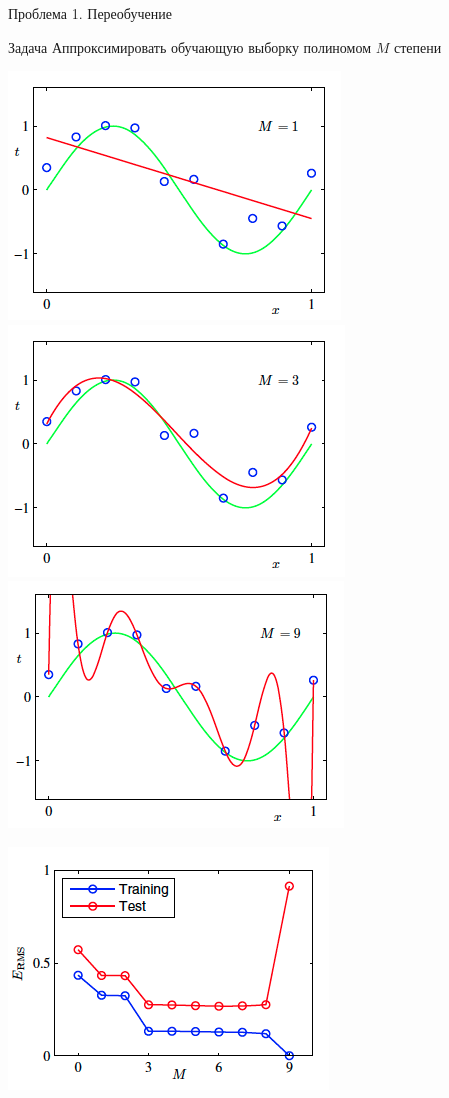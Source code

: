 \documentclass[10pt]{beamer}
\begin{document}
\begin{frame}{Проблема 1. Переобучение}

\begin{block}{Задача}
Аппроксимировать обучающую выборку полиномом $M$ степени
\end{block}

\begin{center}
\includegraphics[scale=0.3]{images/m1.png}
\includegraphics[scale=0.3]{images/m2.png}
\includegraphics[scale=0.3]{images/m3.png}

\includegraphics[scale=0.3]{images/of.png}
\end{center}

\end{frame}
\end{document}

